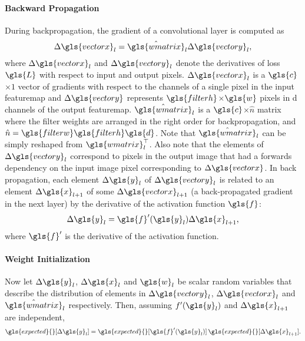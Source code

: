 \documentclass[thesis]{subfiles}
\begin{document}
    \paragraph{Backward Propagation}
    During backpropagation, the gradient of a convolutional layer is computed as
    \begin{equation}
    \Delta \gls{vectorx}_l = \hat{\gls{wmatrix}}_l \Delta \gls{vectory}_l,
    \label{eq:back_prop_gradient}
    \end{equation}
    where $\Delta \gls{vectorx}_l$ and $\Delta \gls{vectory}_l$ denote the derivatives of loss $\gls{L}$ with respect to input and output pixels. $\Delta \gls{vectorx}_l$ is a $\gls{c}$$\times$$1$ vector of gradients with respect to the channels of a single pixel in the input \gls{featuremap} and $\Delta \gls{vectory}$ represents $\gls{filterh}$$\times$$\gls{w}$ pixels in d channels of the output \gls{featuremap}. $\hat{\gls{wmatrix}}_l$ is a $\gls{c}$$\times$$\hat{n}$ matrix where the filter weights are arranged in the right order for backpropagation, and $\hat{n} = \gls{filterw}\gls{filterh}\gls{d}$. Note that $\hat{\gls{wmatrix}}_l$ can be simply reshaped from $\gls{wmatrix}_l^\top$. Also note that the elements of $\Delta \gls{vectory}_l$ correspond to pixels in the output image that had a forwards dependency on the input image pixel corresponding to $\Delta \gls{vectorx}$. In back propagation, each element $\Delta \gls{y}_l$ of $\Delta \gls{vectory}_l$ is related to an element $\Delta \gls{x}_{l+1}$ of some $\Delta \gls{vectorx}_{l+1}$ (\ie a back-propagated gradient in the next layer) by the derivative of the activation function $\gls{f}$:
    \begin{equation}
    \Delta \gls{y}_l = \gls{f}^\prime (\gls{y}_l) \Delta \gls{x}_{l+1},
    \end{equation}
    where $\gls{f}^\prime$ is the derivative of the activation function. 
    
    
    \newcommand{\Expect}{\gls{expected}}
    \newcommand{\Var}{\gls{var}}
    
    \paragraph{Weight Initialization}
    Now let $\Delta \gls{y}_l$, $\Delta \gls{x}_l$ and $\gls{w}_l$ be scalar random variables that describe the distribution of elements in $\Delta \gls{vectory}_l$, $\Delta \gls{vectorx}_{l}$ and $\hat{\gls{wmatrix}}_l$ respectively. Then, assuming $f^\prime (\gls{y}_l)$ and $\Delta \gls{x}_{l+1}$ are independent,
    \begin{equation}
    \Expect{}[\Delta \gls{y}_l] = \Expect{}[\gls{f}^\prime (\gls{y}_l)] \, \Expect{}[ \Delta \gls{x}_{l+1}].
    \end{equation}
    
\end{document}
